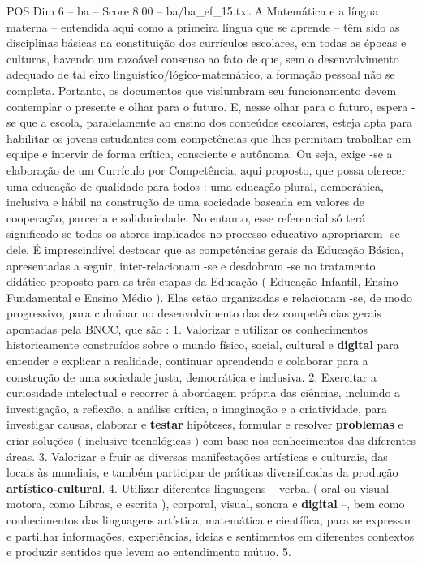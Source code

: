 \begin{textsample}{POS Dim 6 – ba – Score 8.00 – ba/ba\_ef\_15.txt}
A Matemática e a língua materna – entendida aqui como a primeira língua que se aprende – têm sido as disciplinas básicas na constituição dos currículos escolares, em todas as épocas e culturas, havendo um razoável consenso ao fato de que, sem o desenvolvimento adequado de tal eixo linguístico/lógico-matemático, a formação pessoal não se completa.
Portanto, os documentos que vislumbram seu funcionamento devem contemplar o presente e olhar para o futuro.
E, nesse olhar para o futuro, espera -se que a escola, paralelamente ao ensino dos conteúdos escolares, esteja apta para habilitar os jovens estudantes com competências que lhes permitam trabalhar em equipe e intervir de forma crítica, consciente e autônoma.
Ou seja, exige -se a elaboração de um Currículo por Competência, aqui proposto, que possa oferecer uma educação de qualidade para todos : uma educação plural, democrática, inclusiva e hábil na construção de uma sociedade baseada em valores de cooperação, parceria e solidariedade.
No entanto, esse referencial só terá significado se todos os atores implicados no processo educativo apropriarem -se dele.
É imprescindível destacar que as competências gerais da Educação Básica, apresentadas a seguir, inter-relacionam -se e desdobram -se no tratamento didático proposto para as três etapas da Educação ( Educação Infantil, Ensino Fundamental e Ensino Médio ).
Elas estão organizadas e relacionam -se, de modo progressivo, para culminar no desenvolvimento das dez competências gerais apontadas pela BNCC, que são : 1.
Valorizar e utilizar os conhecimentos historicamente construídos sobre o mundo físico, social, cultural e \textbf{digital} para entender e explicar a realidade, continuar aprendendo e colaborar para a construção de uma sociedade justa, democrática e inclusiva. 2.
Exercitar a curiosidade intelectual e recorrer à abordagem própria das ciências, incluindo a investigação, a reflexão, a análise crítica, a imaginação e a criatividade, para investigar causas, elaborar e \textbf{testar} hipóteses, formular e resolver \textbf{problemas} e criar soluções ( inclusive tecnológicas ) com base nos conhecimentos das diferentes áreas. 3.
Valorizar e fruir as diversas manifestações artísticas e culturais, das locais às mundiais, e também participar de práticas diversificadas da produção \textbf{artístico-cultural}. 4.
Utilizar diferentes linguagens – verbal ( oral ou visual-motora, como Libras, e escrita ), corporal, visual, sonora e \textbf{digital} –, bem como conhecimentos das linguagens artística, matemática e científica, para se expressar e partilhar informações, experiências, ideias e sentimentos em diferentes contextos e produzir sentidos que levem ao entendimento mútuo. 5.

\end{textsample}
